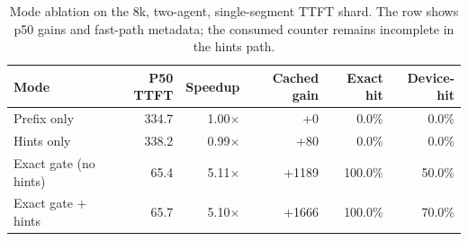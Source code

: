 \begin{table}[t]
\centering
\caption{Mode ablation on the 8k, two-agent, single-segment TTFT shard. The row shows p50 gains and fast-path metadata; the consumed counter remains incomplete in the hints path.}
\label{tab:ablation}
\begin{tabular}{lrrrrr}
\toprule
Mode & P50 TTFT & Speedup & Cached gain & Exact hit & Device-hit \\
\midrule
Prefix only & 334.7 & 1.00$\times$ & +0 & 0.0\% & 0.0\% \\
Hints only & 338.2 & 0.99$\times$ & +80 & 0.0\% & 0.0\% \\
Exact gate (no hints) & 65.4 & 5.11$\times$ & +1189 & 100.0\% & 50.0\% \\
Exact gate + hints & 65.7 & 5.10$\times$ & +1666 & 100.0\% & 70.0\% \\
\bottomrule
\end{tabular}
\end{table}

